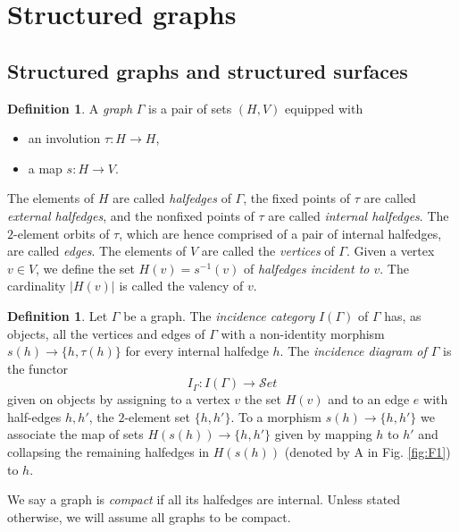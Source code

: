 \documentclass[english,11pt,leqno]{article}
\def\lra{\longrightarrow}
\def\Set{ {\mathcal Set}}
\def\Set{ {\mathcal Set}}
\theoremstyle{definition}
\newtheorem{defi}[thm]{Definition}
\theoremstyle{remark}
\numberwithin{equation}{section}
\begin{document}
 
  
   

\newpage
\section{Structured graphs} \label{sec:structuredgraphs}
\subsection{Structured graphs and structured surfaces}\label{subsec:structuredgraphs}
   
\begin{defi}
A {\em graph} $\Gamma$ is a pair of sets $(H,V)$ equipped with
\begin{itemize}
	\item an involution $\tau: H \to H$,
	\item a map $s: H \to V$.
\end{itemize}
The elements of $H$ are called {\em halfedges} of $\Gamma$, the fixed points of $\tau$ are called
{\em external halfedges}, and the nonfixed points of $\tau$ are called {\em internal halfedges}. 
The $2$-element orbits of $\tau$, which are hence comprised of a pair of internal halfedges, are called {\em edges}. 
The elements of $V$ are called the {\em vertices} of $\Gamma$.  Given a vertex $v \in V$, we define the set $H(v) =
s^{-1}(v)$ of {\em halfedges incident to $v$}. The cardinality $|H(v)|$ is called the valency of
$v$.
\end{defi}

\begin{defi}
Let $\Gamma$ be a graph. The {\em incidence category} $I(\Gamma)$ of $\Gamma$ has, as objects,
all the vertices and edges of $\Gamma$ with a non-identity morphism $s(h) \to
\{h,\tau(h)\}$ for every internal halfedge $h$. The {\em incidence diagram of $\Gamma$} is the functor
\[
	I_{\Gamma}: I(\Gamma) \lra \Set
\]
given on objects by assigning to a vertex $v$ the set $H(v)$ and to an edge $e$ with half-edges $h,h'$,  the
$2$-element set  $\{h,h'\}$. To a morphism $s(h) \to \{h,h'\}$ we associate the map of sets
$H(s(h)) \to \{h,h'\}$ given by mapping $h$ to $h'$ and collapsing the remaining halfedges in
$H(s(h))$  (denoted by A in Fig. \ref{fig:F1}) to $h$.  
\end{defi}

We say a graph is {\em compact} if all its halfedges are internal. Unless stated otherwise, we will
assume all graphs to be compact.
\end{document}
